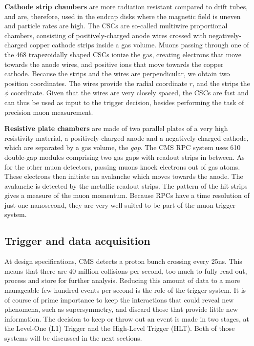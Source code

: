 \textbf{Cathode strip chambers} are more radiation resistant compared to drift tubes, and are,
therefore, used in the endcap disks where the magnetic field is uneven and particle rates are high. 
The CSCs are so-called multiwire proportional chambers, consisting of positively-charged anode wires
crossed with negatively-charged copper cathode strips inside a gas volume. Muons passing through
one of the 468 trapezoidally shaped CSCs ionize the gas, creating electrons that move
towards the anode wires, and positive ions that move towards the copper cathode. 
Because the strips and the wires are perpendicular, we obtain two position coordinates. The
wires provide the radial coordinate $r$, and the strips the $\phi$ coordinate. 
Given that the wires are very closely spaced, the CSCs are fast and can thus be used as input to the
trigger decision, besides performing the task of precision muon measurement. 

\textbf{Resistive plate chambers} are made of two parallel plates of a very high resistivity
material, a positively-charged anode and a negatively-charged cathode, which are separated by a gas
volume, the \textit{gap}. The CMS RPC system uses 610 double-gap modules comprising two gas gaps
with readout strips in between. 
As for the other muon detectors, passing muons knock electrons out of gas atoms. These electrons
then initiate an avalanche which moves towards the anode. The avalanche is detected by the metallic
readout strips. The pattern of the hit strips gives a measure of the muon momentum. Because RPCs
have a time resolution of just one nanosecond, they are very well suited to be part of the muon
trigger system. 



\subsection{Trigger and data acquisition \label{sec:cms_tdaq}}

At design specifications, CMS detects a proton bunch crossing every 25\unit{ns}. This means that
there are 40 million collisions per second, too much to fully read out, process and store for
further analysis. Reducing this amount of data to a more manageable few hundred events
per second is the role of the trigger system. It is of course of prime importance to keep the
interactions that could reveal new phenomena, such as supersymmetry, and discard those that provide
little new information. 
The decision to keep or throw out an event is made in two stages, at the Level-One (L1) Trigger and
the High-Level Trigger (HLT). Both of those systems will be discussed in the next sections. 

